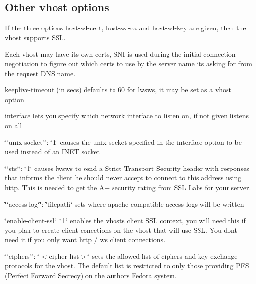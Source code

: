 \subsection*{Other vhost options }


\begin{DoxyItemize}
\item If the three options {\ttfamily host-\/ssl-\/cert}, {\ttfamily host-\/ssl-\/ca} and {\ttfamily host-\/ssl-\/key} are given, then the vhost supports S\+SL.
\end{DoxyItemize}

Each vhost may have its own certs, S\+NI is used during the initial connection negotiation to figure out which certs to use by the server name it\textquotesingle{}s asking for from the request D\+NS name.


\begin{DoxyItemize}
\item {\ttfamily keeplive-\/timeout} (in secs) defaults to 60 for lwsws, it may be set as a vhost option
\item {\ttfamily interface} lets you specify which network interface to listen on, if not given listens on all
\item \char`\"{}`unix-\/socket`\char`\"{}\+: \char`\"{}1\char`\"{} causes the unix socket specified in the interface option to be used instead of an I\+N\+ET socket
\item \char`\"{}`sts`\char`\"{}\+: \char`\"{}1\char`\"{} causes lwsws to send a Strict Transport Security header with responses that informs the client he should never accept to connect to this address using http. This is needed to get the A+ security rating from S\+SL Labs for your server.
\item \char`\"{}`access-\/log`\char`\"{}\+: \char`\"{}filepath\char`\"{} sets where apache-\/compatible access logs will be written
\item {\ttfamily \char`\"{}enable-\/client-\/ssl\char`\"{}}\+: {\ttfamily \char`\"{}1\char`\"{}} enables the vhost\textquotesingle{}s client S\+SL context, you will need this if you plan to create client conections on the vhost that will use S\+SL. You don\textquotesingle{}t need it if you only want http / ws client connections.
\item \char`\"{}`ciphers`\char`\"{}\+: \char`\"{}$<$cipher list$>$\char`\"{} sets the allowed list of ciphers and key exchange protocols for the vhost. The default list is restricted to only those providing P\+FS (Perfect Forward Secrecy) on the author\textquotesingle{}s Fedora system.
\end{DoxyItemize}

